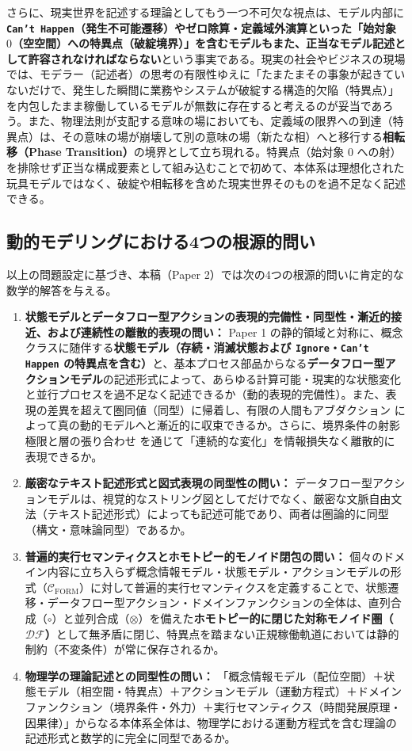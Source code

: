 \documentclass[11pt,a4paper]{ltjsarticle}
\theoremstyle{definition}
\theoremstyle{plain}
\theoremstyle{remark}
\newcommand{\DF}{\mathcal{DF}}
\newcommand{\Cform}{\mathcal{C}_{\mathrm{FORM}}}
\begin{document}
さらに、現実世界を記述する理論としてもう一つ不可欠な視点は、モデル内部に\textbf{\texttt{Can't Happen}（発生不可能遷移）やゼロ除算・定義域外演算といった「始対象 $0$（空空間）への特異点（破綻境界）」を含むモデルもまた、正当なモデル記述として許容されなければならない}という事実である。現実の社会やビジネスの現場では、モデラー（記述者）の思考の有限性ゆえに「たまたまその事象が起きていないだけで、発生した瞬間に業務やシステムが破綻する構造的欠陥（特異点）」を内包したまま稼働しているモデルが無数に存在すると考えるのが妥当であろう。また、物理法則が支配する意味の場においても、定義域の限界への到達（特異点）は、その意味の場が崩壊して別の意味の場（新たな相）へと移行する\textbf{相転移（Phase Transition）}の境界として立ち現れる。特異点（始対象 $0$ への射）を排除せず正当な構成要素として組み込むことで初めて、本体系は理想化された玩具モデルではなく、破綻や相転移を含めた現実世界そのものを過不足なく記述できる。

\subsection{動的モデリングにおける4つの根源的問い}
以上の問題設定に基づき、本稿（Paper 2）では次の4つの根源的問いに肯定的な数学的解答を与える。

\begin{enumerate}
    \item \textbf{状態モデルとデータフロー型アクションの表現的完備性・同型性・漸近的接近、および連続性の離散的表現の問い：} Paper 1 の静的領域と対称に、概念クラスに随伴する\textbf{状態モデル（存続・消滅状態および \texttt{Ignore}・\texttt{Can't Happen} の特異点を含む）}と、基本プロセス部品からなる\textbf{データフロー型アクションモデル}の記述形式によって、あらゆる計算可能・現実的な状態変化と並行プロセスを過不足なく記述できるか（動的表現的完備性）。また、表現の差異を超えて圏同値（同型）に帰着し、有限の人間もアブダクション \cite{peirce1903} によって真の動的モデルへと漸近的に収束できるか。さらに、境界条件の射影極限と層の張り合わせ \cite{maclane1992} を通じて「連続的な変化」を情報損失なく離散的に表現できるか。
    \item \textbf{厳密なテキスト記述形式と図式表現の同型性の問い：} データフロー型アクションモデルは、視覚的なストリング図としてだけでなく、厳密な文脈自由文法（テキスト記述形式）によっても記述可能であり、両者は圏論的に同型（構文・意味論同型）であるか。
    \item \textbf{普遍的実行セマンティクスとホモトピー的モノイド閉包の問い：} 個々のドメイン内容に立ち入らず概念情報モデル・状態モデル・アクションモデルの形式（$\Cform$）に対して普遍的実行セマンティクスを定義することで、状態遷移・データフロー型アクション・ドメインファンクションの全体は、直列合成（$\circ$）と並列合成（$\otimes$）を備えた\textbf{ホモトピー的に閉じた対称モノイド圏（$\DF$）}として無矛盾に閉じ、特異点を踏まない正規稼働軌道においては静的制約（不変条件）が常に保存されるか。
    \item \textbf{物理学の理論記述との同型性の問い：} 「概念情報モデル（配位空間）＋状態モデル（相空間・特異点）＋アクションモデル（運動方程式）＋ドメインファンクション（境界条件・外力）＋実行セマンティクス（時間発展原理・因果律）」からなる本体系全体は、物理学における運動方程式を含む理論の記述形式と数学的に完全に同型であるか。
\end{enumerate}
\end{document}
